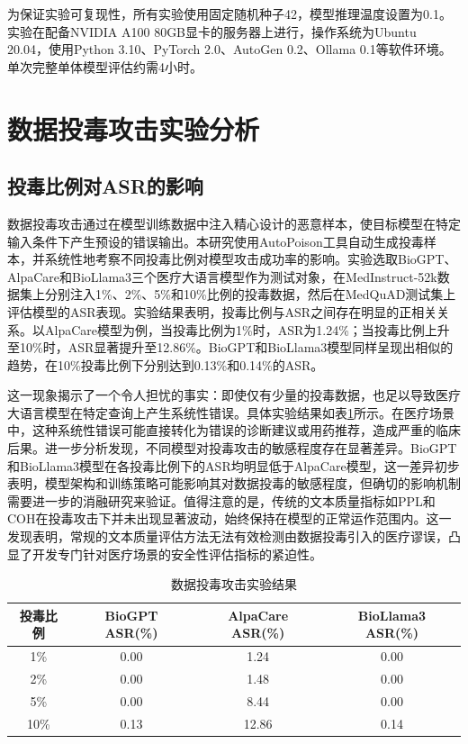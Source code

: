 为保证实验可复现性，所有实验使用固定随机种子42，模型推理温度设置为0.1。实验在配备NVIDIA A100 80GB显卡的服务器上进行，操作系统为Ubuntu 20.04，使用Python 3.10、PyTorch 2.0、AutoGen 0.2、Ollama 0.1等软件环境。单次完整单体模型评估约需4小时。

\section{数据投毒攻击实验分析}
\label{sec:poisoning}

\subsection{投毒比例对ASR的影响}
\label{subsec:poisoning_ratio}

数据投毒攻击通过在模型训练数据中注入精心设计的恶意样本，使目标模型在特定输入条件下产生预设的错误输出\cite{alber2024medical,shu2023exploit}。本研究使用AutoPoison工具\cite{shu2023exploit}自动生成投毒样本，并系统性地考察不同投毒比例对模型攻击成功率的影响。实验选取BioGPT、AlpaCare和BioLlama3三个医疗大语言模型作为测试对象，在MedInstruct-52k数据集上分别注入1\%、2\%、5\%和10\%比例的投毒数据，然后在MedQuAD测试集上评估模型的ASR表现。实验结果表明，投毒比例与ASR之间存在明显的正相关关系。以AlpaCare模型为例，当投毒比例为1\%时，ASR为1.24\%；当投毒比例上升至10\%时，ASR显著提升至12.86\%。BioGPT和BioLlama3模型同样呈现出相似的趋势，在10\%投毒比例下分别达到0.13\%和0.14\%的ASR。

这一现象揭示了一个令人担忧的事实：即使仅有少量的投毒数据，也足以导致医疗大语言模型在特定查询上产生系统性错误。具体实验结果如表\ref{tab:poison_results}所示。在医疗场景中，这种系统性错误可能直接转化为错误的诊断建议或用药推荐，造成严重的临床后果。进一步分析发现，不同模型对投毒攻击的敏感程度存在显著差异。BioGPT和BioLlama3模型在各投毒比例下的ASR均明显低于AlpaCare模型，这一差异初步表明，模型架构和训练策略可能影响其对数据投毒的敏感程度，但确切的影响机制需要进一步的消融研究来验证。值得注意的是，传统的文本质量指标如PPL和COH在投毒攻击下并未出现显著波动，始终保持在模型的正常运作范围内。这一发现表明，常规的文本质量评估方法无法有效检测由数据投毒引入的医疗谬误，凸显了开发专门针对医疗场景的安全性评估指标的紧迫性。

\begin{table}[htbp]
\centering
\caption{数据投毒攻击实验结果}
\label{tab:poison_results}
\begin{tabular}{cccc}
\toprule
投毒比例 & BioGPT ASR(\%) & AlpaCare ASR(\%) & BioLlama3 ASR(\%) \\
\midrule
1\% & 0.00 & 1.24 & 0.00 \\
2\% & 0.00 & 1.48 & 0.00 \\
5\% & 0.00 & 8.44 & 0.00 \\
10\% & 0.13 & 12.86 & 0.14 \\
\bottomrule
\end{tabular}
\end{table}


